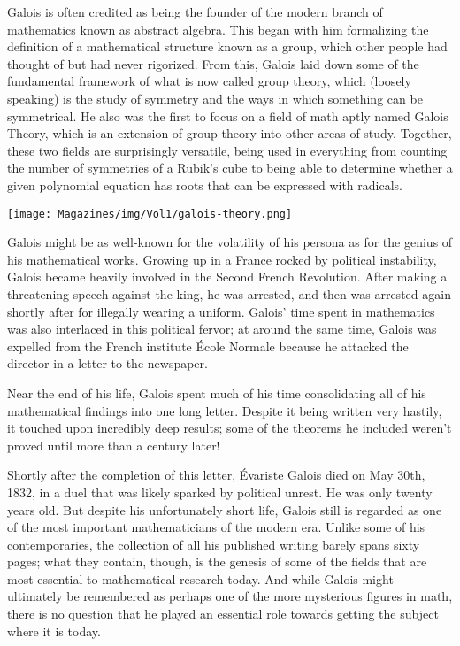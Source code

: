 \documentclass{article}
\begin{document}
\begin{multicols}{3}
Galois is often credited as being the founder of the modern branch of mathematics known as abstract algebra. This began with him formalizing the definition of a mathematical structure known as a group, which other people had thought of but had never rigorized. From this, Galois laid down some of the fundamental framework of what is now called group theory, which (loosely speaking) is the study of symmetry and the ways in which something can be symmetrical. He also was the first to focus on a field of math aptly named Galois Theory, which is an extension of group theory into other areas of study. Together, these two fields are surprisingly versatile, being used in everything from counting the number of symmetries of a Rubik’s cube to being able to determine whether a given polynomial equation has roots that can be expressed with radicals.

\begin{center}
    \texttt{[image: Magazines/img/Vol1/galois-theory.png]}
\end{center}

Galois might be as well-known for the volatility of his persona as for the genius of his mathematical works. Growing up in a France rocked by political instability, Galois became heavily involved in the Second French Revolution. After making a threatening speech against the king, he was arrested, and then was arrested again shortly after for illegally wearing a uniform. Galois’ time spent in mathematics was also interlaced in this political fervor; at around the same time, Galois was expelled from the French institute École Normale because he attacked the director in a letter to the newspaper. 

Near the end of his life, Galois spent much of his time consolidating all of his mathematical findings into one long letter. Despite it being written very hastily, it touched upon incredibly deep results; some of the theorems he included weren’t proved until more than a century later! 

Shortly after the completion of this letter, Évariste Galois died on May 30th, 1832, in a duel that was likely sparked by political unrest. He was only twenty years old. But despite his unfortunately short life, Galois still is regarded as one of the most important mathematicians of the modern era. Unlike some of his contemporaries, the collection of all his published writing barely spans sixty pages; what they contain, though, is the genesis of some of the fields that are most essential to mathematical research today. And while Galois might ultimately be remembered as perhaps one of the more mysterious figures in math, there is no question that he played an essential role towards getting the subject where it is today. 
\closearticle



\end{multicols}
\end{document}
